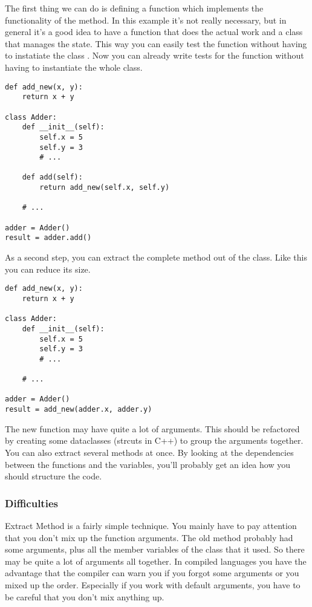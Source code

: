 The first thing we can do is defining a function  which implements the functionality of the  method. In this example it's not really necessary, but in general it's a good idea to have a function that does the actual work and a class that manages the state. This way you can easily test the function  without having to instatiate the class . Now you can already write tests for the function without having to instantiate the whole class.

\begin{programcode}{}
\begin{verbatim}
def add_new(x, y):
    return x + y

class Adder:
    def __init__(self):
        self.x = 5
        self.y = 3
        # ...

    def add(self):
        return add_new(self.x, self.y)
    
    # ...

adder = Adder()
result = adder.add()
\end{verbatim}
\end{programcode}

As a second step, you can extract the complete method out of the class. Like this you can reduce its size.

\begin{programcode}{}
\begin{verbatim}
def add_new(x, y):
    return x + y

class Adder:
    def __init__(self):
        self.x = 5
        self.y = 3
        # ...
    
    # ...

adder = Adder()
result = add_new(adder.x, adder.y)
\end{verbatim}
\end{programcode}

The new function may have quite a lot of arguments. This should be refactored by creating some dataclasses (strcuts in C++) to group the arguments together. You can also extract several methods at once. By looking at the dependencies between the functions and the variables, you'll probably get an idea how you should structure the code.

\subsubsection*{Difficulties}

Extract Method is a fairly simple technique. You mainly have to pay attention that you don't mix up the function arguments. The old method probably had some arguments, plus all the member variables of the class that it used. So there may be quite a lot of arguments all together. In compiled languages you have the advantage that the compiler can warn you if you forgot some arguments or you mixed up the order. Especially if you work with default arguments, you have to be careful that you don't mix anything up.

